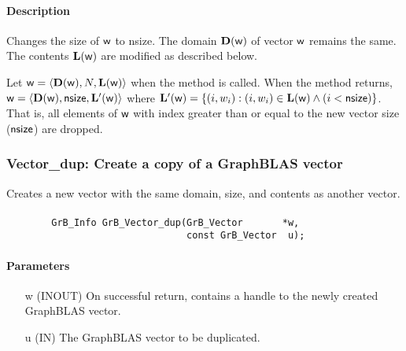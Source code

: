 \paragraph{Description}

Changes the size of ${\sf w}$ to {\sf nsize}. The domain
$\mathbf{D}({\sf w})$ of vector ${\sf w}$ remains the same. The
contents $\mathbf{L}({\sf w})$ are modified as described below.

Let ${\sf w} = \langle \mathbf{D}({\sf w}), N, \mathbf{L}({\sf w})
\rangle$ when the method is called. When the method returns, ${\sf w}
= \langle \mathbf{D}({\sf w}), {\sf nsize}, \mathbf{L'}({\sf w})
\rangle$ where $\mathbf{L'}({\sf w}) = \{(i,w_i) : (i,w_i) \in
\mathbf{L}({\sf w}) \wedge (i < {\sf nsize})\}$. That is, all elements
of ${\sf w}$ with index greater than or equal to the new vector size
(${\sf nsize}$) are dropped.


\subsubsection{{\sf Vector\_dup}: Create a copy of a GraphBLAS vector}

Creates a new vector with the same domain, size, and contents as another vector.

\paragraph{\syntax}

\begin{verbatim}
        GrB_Info GrB_Vector_dup(GrB_Vector       *w,
                                const GrB_Vector  u);
\end{verbatim}

\paragraph{Parameters}

\begin{itemize}[leftmargin=1.1in]
    \item[{\sf w}]  ({\sf INOUT}) On successful return, contains a handle
                                  to the newly created GraphBLAS vector.
    \item[{\sf u}]  ({\sf IN})    The GraphBLAS vector to be duplicated.
\end{itemize}

